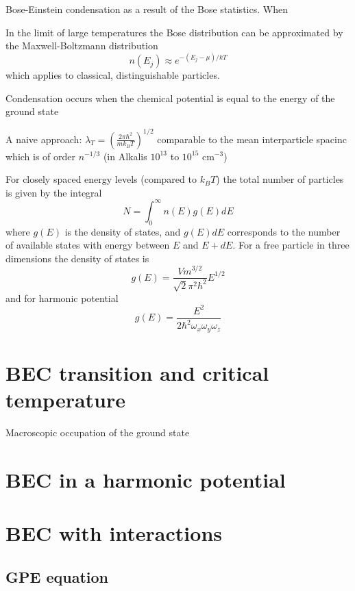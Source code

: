 Bose-Einstein condensation as a result of the Bose statistics. When 



In the limit of large temperatures the Bose distribution can be approximated by the Maxwell-Boltzmann distribution
%
\begin{equation}
	n(E_j)\approx e^{-(E_j-\mu)/kT}
\end{equation}
%
which applies to classical, distinguishable particles. 

Condensation occurs when the chemical potential is equal to the energy of the ground state

A naive approach: $\lambda_T=\left(\frac{2\pi\hbar^2}{mk_BT}\right)^{1/2}$ comparable to the mean interparticle spacinc which is of order $n^{-1/3}$ (in Alkalis $10^{13}$ to $10^{15}$ cm$^{-3}$)

For closely spaced energy levels (compared to $k_B T$) the total number of particles is given by the integral
%
\begin{equation}
	N=\int_0^\infty n(E) g(E) dE
\end{equation}
%
where $g(E)$ is the density of states, and $g(E)dE$ corresponds to the number of available states with energy between $E$ and $E+dE$. For a free particle in three dimensions the density of states is
%
\begin{equation}
	g(E)=\frac{V m^{3/2}}{\sqrt{2}\pi^2\hbar^2}E^{1/2}
\end{equation}
%
and for harmonic potential
%
\begin{equation}
	g(E)=\frac{E^2}{2\hbar^2\omega_x\omega_y\omega_z}
\end{equation}


\section{BEC transition and critical temperature}

Macroscopic occupation of the ground state
\section{BEC in a harmonic potential}
\section{BEC with interactions}
\subsection{GPE equation}
